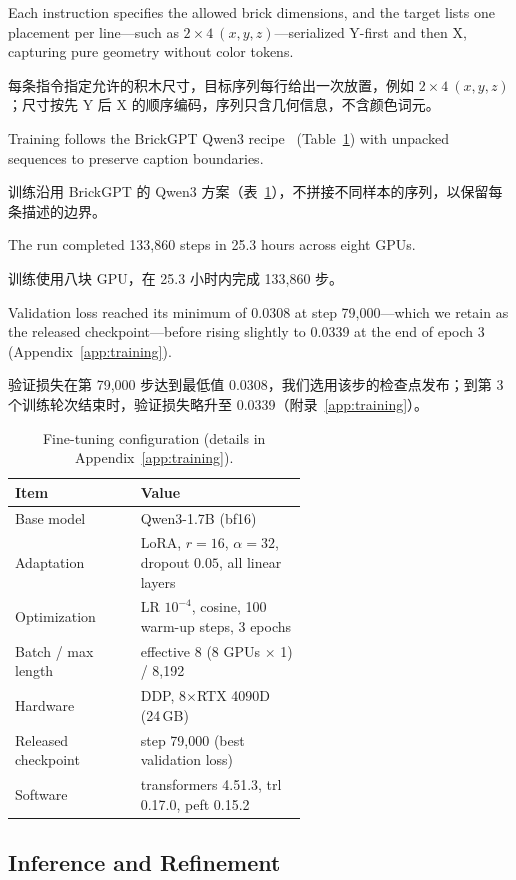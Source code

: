 \documentclass[11pt,letterpaper]{article}
\let\cite\citep
\newcommand{\zh}[1]{{\chinesefont #1}}
\newcommand{\pair}[2]{\par\addvspace{4pt}\noindent
  \begin{minipage}{\linewidth}\raggedright
  #1\par\nobreak\vspace{1pt}
  {\color{translation}\chinesefont\fontsize{10.5}{15.3}\selectfont #2\par}
  \end{minipage}\par}
\begin{document}
\pair{Each instruction specifies the allowed brick dimensions, and the target lists one placement per line---such as $2{\times}4\ (x,y,z)$---serialized Y-first and then X, capturing pure geometry without color tokens.}{每条指令指定允许的积木尺寸，目标序列每行给出一次放置，例如 $2{\times}4\ (x,y,z)$；尺寸按先 Y 后 X 的顺序编码，序列只含几何信息，不含颜色词元。}

\pair{Training follows the BrickGPT Qwen3 recipe~\cite{brickgpt} (Table~\ref{tab:finetune-config}) with unpacked sequences to preserve caption boundaries.}{训练沿用 BrickGPT 的 Qwen3 方案（表~\ref{tab:finetune-config}），不拼接不同样本的序列，以保留每条描述的边界。}

\pair{The run completed 133,860 steps in 25.3 hours across eight GPUs.}{训练使用八块 GPU，在 25.3 小时内完成 133,860 步。}

\pair{Validation loss reached its minimum of 0.0308 at step 79,000---which we retain as the released checkpoint---before rising slightly to 0.0339 at the end of epoch 3 (Appendix~\ref{app:training}).}{验证损失在第 79,000 步达到最低值 0.0308，我们选用该步的检查点发布；到第 3 个训练轮次结束时，验证损失略升至 0.0339（附录~\ref{app:training}）。}

\begin{table}[!htbp]
\centering
\small
\setlength{\tabcolsep}{3pt}
\begin{tabular}{@{}l>{\raggedright\arraybackslash}p{0.58\linewidth}@{}}
\toprule
Item & Value \\
\midrule
Base model & Qwen3-1.7B (bf16) \\
Adaptation & LoRA, $r=16$, $\alpha=32$, dropout $0.05$, all linear layers \\
Optimization & LR $10^{-4}$, cosine, 100 warm-up steps, 3 epochs \\
Batch / max length & effective 8 (8 GPUs $\times$ 1) / 8,192 \\
Hardware & DDP, 8$\times$RTX 4090D (24\,GB) \\
Released checkpoint & step 79,000 (best validation loss) \\
Software & transformers 4.51.3, trl 0.17.0, peft 0.15.2 \\
\bottomrule
\end{tabular}
\caption{Fine-tuning configuration (details in Appendix~\ref{app:training}).}
\label{tab:finetune-config}
\end{table}

\subsection{Inference and Refinement\enspace\zh{推理与几何修复}}
\end{document}
